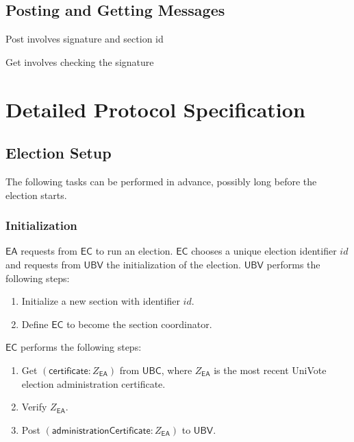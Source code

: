 \documentclass[bibtotoc,halfparskip,oneside]{scrreprt}
\newcommand{\eid}{\mathit{id}\xspace}
\newcommand{\EA}{\ensuremath{\mathsf{EA}}\xspace}
\newcommand{\EC}{\ensuremath{\mathsf{EC}}\xspace}
\newcommand{\UBC}{\ensuremath{\mathsf{UBC}}\xspace}
\newcommand{\UBV}{\ensuremath{\mathsf{UBV}}\xspace}
\begin{document}
\subsection{Posting and Getting Messages}

Post involves signature and section id

Get involves checking the signature

\section{Detailed Protocol Specification}



\subsection{Election Setup}

The following tasks can be performed in advance, possibly long before the election starts.

\subsubsection{Initialization}

\EA requests from \EC to run an election. \EC chooses a unique election identifier $\eid$ and requests from \UBV the initialization of the election. \UBV performs the following steps: 
\begin{enumerate}
	\item Initialize a new section with identifier $\eid$.
	\item Define \EC to become the section coordinator.
\end{enumerate}

\EC performs the following steps: 
\begin{enumerate}[resume]
	\item Get $(\textsf{certificate}:Z_{\EA})$ from \UBC, where $Z_{\EA}$ is the most recent UniVote election administration certificate.
	\item Verify $Z_{\EA}$.
	\item Post $(\mathsf{administrationCertificate}: Z_{\EA})$ to \UBV.
\end{enumerate}
\end{document}
